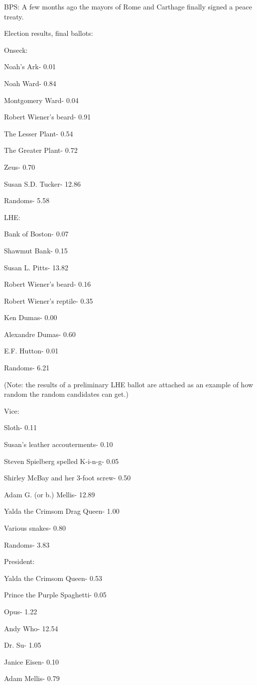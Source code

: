 \documentclass[12pt]{article}
\begin{document}
BPS: A few months ago the mayors of Rome and Carthage finally signed a peace treaty.

Election results, final ballots:

Onseck:

Noah's Ark- 0.01

Noah Ward- 0.84

Montgomery Ward- 0.04

Robert Wiener's beard- 0.91

The Lesser Plant- 0.54

The Greater Plant- 0.72

Zeus- 0.70

Susan S.D. Tucker- 12.86

Randoms- 5.58

LHE:

Bank of Boston- 0.07

Shawmut Bank- 0.15

Susan L. Pitts- 13.82

Robert Wiener's beard- 0.16

Robert Wiener's reptile- 0.35

Ken Dumas- 0.00

Alexandre Dumas- 0.60

E.F. Hutton- 0.01

Randoms- 6.21

(Note: the results of a preliminary LHE ballot are attached as an example of how random the random candidates can get.)

Vice:

Sloth- 0.11

Susan's leather accouterments- 0.10

Steven Spielberg spelled K-i-n-g- 0.05

Shirley McBay and her 3-foot screw- 0.50

Adam G. (or b.) Mellis- 12.89

Yalda the Crimsom Drag Queen- 1.00

Various snakes- 0.80

Randoms- 3.83

President:

Yalda the Crimsom Queen- 0.53

Prince the Purple Spaghetti- 0.05

Opus- 1.22

Andy Who- 12.54

Dr. Su- 1.05

Janice Eisen- 0.10

Adam Mellis- 0.79
\end{document}
